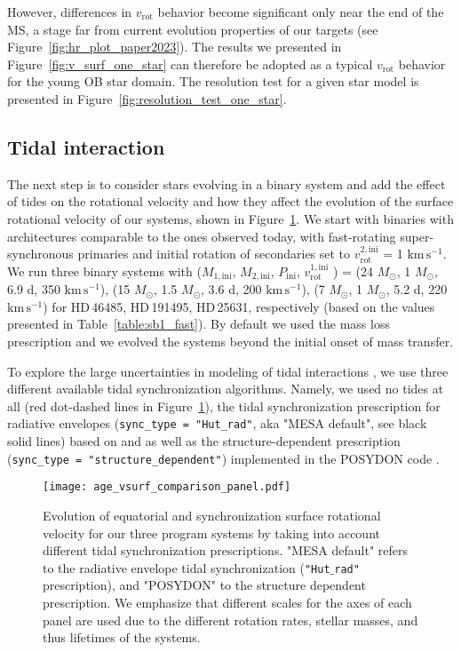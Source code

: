 \documentclass{aa}
\newcommand{\kms}{$\mathrm{km\,s^{-1}}$}
\DeclareRobustCommand{\Figref}[1]{Figure~\ref{#1}}
\DeclareRobustCommand{\Tabref}[1]{Table~\ref{#1}}
\begin{document}
However, differences in $v_\mathrm{rot}$
behavior become significant only near the end of the MS, a stage far from
current evolution properties of our targets (see \Figref{fig:hr_plot_paper2023}). The results we presented in
\Figref{fig:v_surf_one_star} can therefore be adopted as a typical
$v_\mathrm{rot}$ behavior for the young OB star domain. The resolution
test for a given star model is presented in
\Figref{fig:resolution_test_one_star}.



\subsection{Tidal interaction}

The next step is to consider stars evolving in a binary system and add the effect of tides on the rotational velocity
and how they affect the evolution of the surface rotational
  velocity of our systems, shown in \Figref{fig:v_surf}. We
start with binaries with architectures comparable to the ones observed
today, with fast-rotating super-synchronous primaries and initial rotation of secondaries set to $v_\mathrm{rot}^\mathrm{2,ini}$ = 1 \kms.
We run three binary systems with ($M_\mathrm{1,ini}$, $M_\mathrm{2,ini}$,
$P_\mathrm{ini}$, $v_\mathrm{rot}^\mathrm{1,ini}$ ) = (24 $M_{\odot}$, 1 $M_{\odot}$, 6.9 d, 350 \kms), (15 $M_{\odot}$, 1.5 $M_{\odot}$,  3.6 d, 200 \kms), (7 $M_{\odot}$, 1 $M_{\odot}$, 5.2 d, 220 \kms) for HD\,46485, HD\,191495, HD\,25631, respectively (based on the values presented in \Tabref{table:sb1_fast}).
By default we used the \citet{Vink_2001} mass loss prescription and we evolved the systems beyond the initial onset of mass transfer.


To explore the large uncertainties in modeling of tidal interactions
\citep[e.g.,][]{zahn:75, Zahn_1977, Qin_2018, preece:22, fuller:22}, we use three different
available tidal synchronization algorithms. Namely, we used
no tides at all (red dot-dashed lines in \Figref{fig:v_surf}), the tidal synchronization prescription for radiative envelopes
(\texttt{sync\_type = "Hut\_rad"}, aka "MESA default", see black solid lines) based on \citet{Hut_1980} and
\citet{Hurley_2002} as well as the structure-dependent
prescription (\texttt{sync\_type = "structure\_dependent"})
implemented in the POSYDON code \citep[blue dashed lines, based on][]{Qin_2018, Fragos_2023}.

\begin{figure}[!ht]
  \centering
  \texttt{[image: age\_vsurf\_comparison\_panel.pdf]}
  \caption{Evolution of equatorial and synchronization surface rotational velocity for our
    three program systems by taking into account different tidal
    synchronization prescriptions. "MESA default" refers to the
    radiative envelope tidal synchronization (\texttt{"Hut$\_$rad"}
    prescription), and "POSYDON" to the structure dependent
    prescription. We emphasize that different scales for the axes of
      each panel are used due to the different rotation rates, stellar
      masses, and thus lifetimes of the systems.}
  \label{fig:v_surf}
\end{figure}
\end{document}
